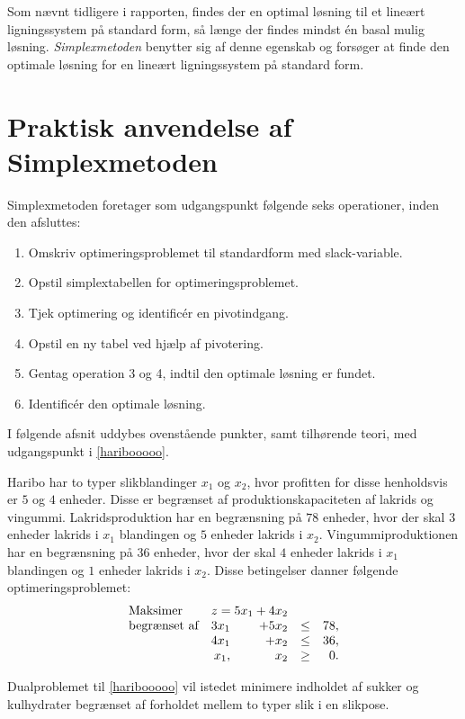 Som nævnt tidligere i rapporten, findes der en optimal løsning til et lineært ligningssystem på standard form, så længe der findes mindst én basal mulig løsning. 
\textit{Simplexmetoden} benytter sig af denne egenskab og forsøger at finde den optimale løsning for en lineært ligningssystem på standard form.
%
%
\section{Praktisk anvendelse af Simplexmetoden}
Simplexmetoden foretager som udgangspunkt følgende seks operationer, inden den afsluttes: 
%
\begin{col}{}{}
%
\begin{enumerate}
\item Omskriv optimeringsproblemet til standardform med slack-variable.  %
\item Opstil simplextabellen for optimeringsproblemet.					 %
\item Tjek optimering og identificér en pivotindgang.					 %
\item Opstil en ny tabel ved hjælp af pivotering. 						 %
\item Gentag operation 3 og 4, indtil den optimale løsning er fundet. 					 %
\item Identificér den optimale løsning.									 %
\end{enumerate}
%
\end{col}
\noindent
%
I følgende afsnit uddybes ovenstående punkter, samt tilhørende teori, med udgangspunkt i \ref{haribooooo}.
%
\\
%
\begin{eks}
\label{haribooooo}
Haribo har to typer slikblandinger $x_1$ og $x_2$, hvor profitten for disse henholdsvis er $5$ og $4$ enheder.
Disse er begrænset af produktionskapaciteten af lakrids og vingummi.
Lakridsproduktion har en begrænsning på $78$ enheder, hvor der skal $3$ enheder lakrids i $x_1$ blandingen og $5$ enheder lakrids i $x_2$.
Vingummiproduktionen har en begrænsning på $36$ enheder, hvor der skal $4$ enheder lakrids i $x_1$ blandingen og $1$ enheder lakrids i $x_2$. 
%
Disse betingelser danner følgende optimeringsproblemet:
%
\begin{align*}
\begin{array}{lrrlr} 
\text{Maksimer}		&	\multicolumn{2}{c}{z=5x_1+4x_2}  &\\
\text{begrænset af}	&3x_1& +5x_2			&\leq 	&78,\\
					&4x_1& + x_2				&\leq	& 36,\\
					&x_1,& x_2				&\geq	& 0.
\end{array}
\end{align*}
%
\end{eks}
% 
Dualproblemet til \ref{haribooooo} vil istedet minimere indholdet af sukker og kulhydrater begrænset af forholdet mellem to typer slik i en slikpose.
%
